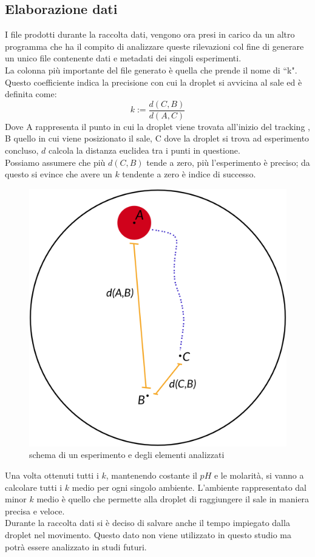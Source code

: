 \subsection{Elaborazione dati}
I file prodotti durante la raccolta dati, vengono ora presi in carico da un altro programma che ha il compito di analizzare queste rilevazioni col fine di generare un unico file contenente dati e metadati dei singoli esperimenti.
\\La colonna più importante del file generato è quella che prende il nome di ``k". Questo coefficiente indica la precisione con cui la droplet si avvicina al sale ed è definita come:
\begin{equation} 	
	k := \frac { d(C,B) }{ d(A,C) }
\end{equation}
Dove A rappresenta il punto in cui la droplet viene trovata all'inizio del tracking , B quello in cui viene posizionato il sale, C dove la droplet si trova ad esperimento concluso, $d$ calcola la distanza euclidea tra i punti in questione. 
\\Possiamo assumere che più $d(C,B)$ tende a zero, più l'esperimento è preciso; da questo si evince che avere un $k$ tendente a zero è indice di successo.   
\begin{figure}[h]
	  \includegraphics[scale=0.30]{immagini/schema.png}
		\centering
	 \caption{schema di un esperimento e degli elementi analizzati}
\end{figure} 
Una volta ottenuti tutti i $k$, mantenendo costante il $pH$ e le molarità, si vanno a calcolare tutti i $k$ medio per ogni singolo ambiente. L'ambiente rappresentato dal minor $k$ medio è quello che permette alla droplet di raggiungere il sale in maniera precisa e veloce. 
\\Durante la raccolta dati si è deciso di salvare anche il tempo impiegato dalla droplet nel movimento. Questo dato non viene utilizzato in questo studio ma potrà essere analizzato in studi futuri. 

